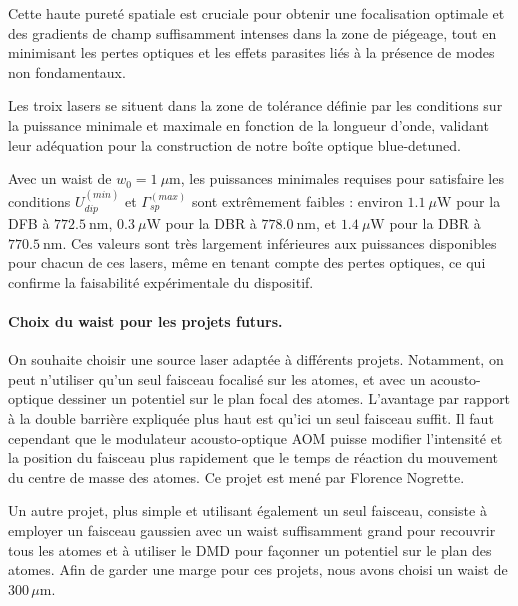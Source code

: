 Cette haute pureté spatiale est cruciale pour obtenir une focalisation optimale et des gradients de champ suffisamment intenses dans la zone de piégeage, tout en minimisant les pertes optiques et les effets parasites liés à la présence de modes non fondamentaux.

\smallskip

Les troix lasers  se situent dans la zone de tolérance définie par les conditions sur la puissance minimale et maximale en fonction de la longueur d’onde, validant leur adéquation pour la construction de notre boîte optique blue-detuned.

\medskip

Avec un waist de $w_0 = 1~\mu\text{m}$, les puissances minimales requises pour satisfaire les conditions $U_{dip}^{(min)}$ et $\Gamma_{sp}^{(max)}$ sont extrêmement faibles : environ $1.1~\mu\text{W}$ pour la \gls{DFB} à $772.5~\text{nm}$, $0.3~\mu\text{W}$ pour la \gls{DBR} à $778.0~\text{nm}$, et $1.4~\mu\text{W}$ pour la DBR à $770.5~\text{nm}$. Ces valeurs sont très largement inférieures aux puissances disponibles pour chacun de ces lasers, même en tenant compte des pertes optiques, ce qui confirme la faisabilité expérimentale du dispositif.

\paragraph{Choix du waist pour les projets futurs.}

On souhaite choisir une source laser adaptée à différents projets. 
Notamment, on peut n’utiliser qu’un seul faisceau focalisé sur les atomes, et avec un acousto-optique dessiner un potentiel sur le plan focal des atomes. 
L’avantage par rapport à la double barrière expliquée plus haut est qu’ici un seul faisceau suffit. 
Il faut cependant que le modulateur acousto-optique \gls{AOM} puisse modifier l’intensité et la position du faisceau plus rapidement que le temps de réaction du mouvement du centre de masse des atomes. Ce projet est mené par Florence Nogrette.

\medskip

Un autre projet, plus simple et utilisant également un seul faisceau, consiste à employer un faisceau gaussien avec un waist suffisamment grand pour recouvrir tous les atomes et à utiliser le DMD pour façonner un potentiel sur le plan des atomes. 
Afin de garder une marge pour ces projets, nous avons choisi un waist de $300\,\mu\mathrm{m}$.
 


